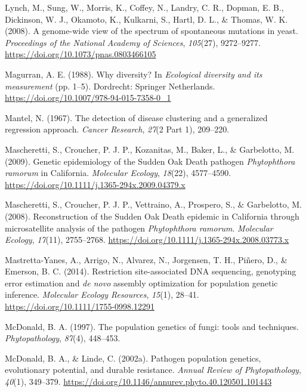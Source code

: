 \documentclass[double,11pt]{beavtex}
\begin{document}
  \hypertarget{ref-lynch2008genome}{}
  Lynch, M., Sung, W., Morris, K., Coffey, N., Landry, C. R., Dopman, E.
  B., Dickinson, W. J., Okamoto, K., Kulkarni, S., Hartl, D. L., \&
  Thomas, W. K. (2008). A genome-wide view of the spectrum of spontaneous
  mutations in yeast. \emph{Proceedings of the National Academy of
  Sciences}, \emph{105}(27), 9272--9277.
  \url{https://doi.org/10.1073/pnas.0803466105}
  
  \hypertarget{ref-magurran1988diversity}{}
  Magurran, A. E. (1988). Why diversity? In \emph{Ecological diversity and
  its measurement} (pp. 1--5). Dordrecht: Springer Netherlands.
  \url{https://doi.org/10.1007/978-94-015-7358-0_1}
  
  \hypertarget{ref-mantel1967detection}{}
  Mantel, N. (1967). The detection of disease clustering and a generalized
  regression approach. \emph{Cancer Research}, \emph{27}(2 Part 1),
  209--220.
  
  \hypertarget{ref-mascheretti2009genetic}{}
  Mascheretti, S., Croucher, P. J. P., Kozanitas, M., Baker, L., \&
  Garbelotto, M. (2009). Genetic epidemiology of the Sudden Oak Death
  pathogen \emph{Phytophthora ramorum} in California. \emph{Molecular
  Ecology}, \emph{18}(22), 4577--4590.
  \url{https://doi.org/10.1111/j.1365-294x.2009.04379.x}
  
  \hypertarget{ref-mascheretti2008reconstruction}{}
  Mascheretti, S., Croucher, P. J. P., Vettraino, A., Prospero, S., \&
  Garbelotto, M. (2008). Reconstruction of the Sudden Oak Death epidemic
  in California through microsatellite analysis of the pathogen
  \emph{Phytophthora ramorum}. \emph{Molecular Ecology}, \emph{17}(11),
  2755--2768. \url{https://doi.org/10.1111/j.1365-294x.2008.03773.x}
  
  \hypertarget{ref-mastretta2015restriction}{}
  Mastretta-Yanes, A., Arrigo, N., Alvarez, N., Jorgensen, T. H., Piñero,
  D., \& Emerson, B. C. (2014). Restriction site-associated DNA
  sequencing, genotyping error estimation and \emph{de novo} assembly
  optimization for population genetic inference. \emph{Molecular Ecology
  Resources}, \emph{15}(1), 28--41.
  \url{https://doi.org/10.1111/1755-0998.12291}
  
  \hypertarget{ref-mcdonald1997population}{}
  McDonald, B. A. (1997). The population genetics of fungi: tools and
  techniques. \emph{Phytopathology}, \emph{87}(4), 448--453.
  
  \hypertarget{ref-mcdonald2002pathogen}{}
  McDonald, B. A., \& Linde, C. (2002a). Pathogen population genetics,
  evolutionary potential, and durable resistance. \emph{Annual Review of
  Phytopathology}, \emph{40}(1), 349--379.
  \url{https://doi.org/10.1146/annurev.phyto.40.120501.101443}
  
\end{document}
